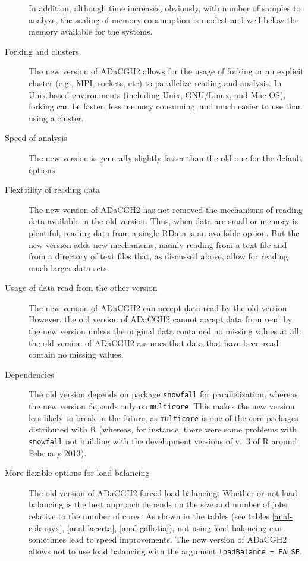 \documentclass[a4paper,11pt]{article}
\begin{document}
\begin{description}
 In addition, although time increases, obviously, with number of samples
  to analyze, the scaling of memory consumption is modest and well below
  the memory available for the systems.

\item[Forking and clusters] The new version of ADaCGH2 allows for the
  usage of forking or an explicit cluster (e.g., MPI, sockets, etc) to
  parallelize reading and analysis. In Unix-based environments (including
  Unix, GNU/Linux, and Mac OS), forking can be faster, less memory
  consuming, and much easier to use than using a cluster.


\item[Speed of analysis] The new version is generally slightly faster than
  the old one for the default options.

\item[Flexibility of reading data] The new version of ADaCGH2 has not
  removed the mechanisms of reading data available in the old
  version. Thus, when data are small or memory is plentiful, reading data
  from a single RData is an available option. But the new version adds new
  mechanisms, mainly reading from a text file and from a directory of text
  files that, as discussed above, allow for reading much larger data sets.

\item[Usage of data read from the other version] The new version of
  ADaCGH2 can accept data read by the old version. However, the old
  version of ADaCGH2 cannot accept data from read by the new version
  unless the original data contained no missing values at all: the old
  version of ADaCGH2 assumes that data that have been read contain no
  missing values.



\item[Dependencies] The old version depends on package \texttt{snowfall}
  for parallelization, whereas the new version depends only on
  \texttt{multicore}. This makes the new version less likely to break in
  the future, as \texttt{multicore} is one of the core packages
  distributed with R (whereas, for instance, there were some problems with
  \texttt{snowfall} not building with the development versions of v.\ 3 of
  R around February 2013).



\item[More flexible options for load balancing] The old version of ADaCGH2
  forced load balancing. Whether or not load-balancing is the best
  approach depends on the size and number of jobs relative to the number
  of cores. As shown in the tables (see tables \ref{anal-coleonyx},
  \ref{anal-lacerta}, \ref{anal-gallotia}), not using load balancing can
  sometimes lead to speed improvements. The new version of ADaCGH2 allows
  not to use load balancing with the argument \texttt{loadBalance = FALSE}.


\end{description}
\end{document}
